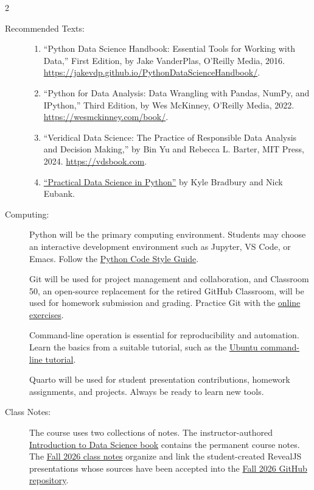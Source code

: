 \documentclass{article}
\let\proglang=\textsf
\begin{document}
\begin{multicols}{2}
\begin{description}
\item[Recommended Texts:]\hspace{0pt}
  \begin{enumerate}
  \item
    ``Python Data Science Handbook: Essential Tools for Working with Data,''
    First Edition, by Jake VanderPlas, O'Reilly Media, 2016.
    \url{https://jakevdp.github.io/PythonDataScienceHandbook/}.
  \item
    ``Python for Data Analysis: Data Wrangling with Pandas, NumPy, and
    IPython,'' Third Edition, by Wes McKinney, O'Reilly Media, 2022.
    \url{https://wesmckinney.com/book/}.
  \item
    ``Veridical Data Science: The Practice of Responsible Data Analysis and
    Decision Making,'' by Bin Yu and Rebecca L. Barter, MIT Press, 2024.
    \url{https://vdsbook.com}.
  \item
    \href{https://www.practicaldatascience.org}{``Practical Data Science in
    Python''} by Kyle Bradbury and Nick Eubank.
  \end{enumerate}

\item[Computing:]
  \proglang{Python} will be the primary computing environment. Students may
  choose an interactive development environment such as Jupyter, VS Code, or
  Emacs. Follow the
  \href{https://peps.python.org/pep-0008/}{Python Code Style Guide}.

  \proglang{Git} will be used for project management and collaboration, and
  Classroom 50, an open-source replacement for the retired GitHub Classroom,
  will be used for homework submission and grading. Practice
  Git with the \href{https://gitexercises.fracz.com}{online exercises}.

  Command-line operation is essential for reproducibility and automation.
  Learn the basics from a suitable tutorial, such as the
  \href{https://ubuntu.com/tutorials/command-line-for-beginners}{Ubuntu
  command-line tutorial}.

  \proglang{Quarto} will be used for student presentation contributions,
  homework assignments, and projects. Always be ready to learn new tools.

\item[Class Notes:]
  The course uses two collections of notes. The instructor-authored
  \href{https://statds.github.io/ids-book/}{Introduction to Data Science book}
  contains the permanent course notes. The
  \href{https://statds.github.io/ids-f26/}{Fall 2026 class notes}
  organize and link the student-created RevealJS presentations whose sources
  have been accepted into the
  \href{https://github.com/statds/ids-f26}{Fall 2026 GitHub repository}.


\end{description}
\end{multicols}
\end{document}
